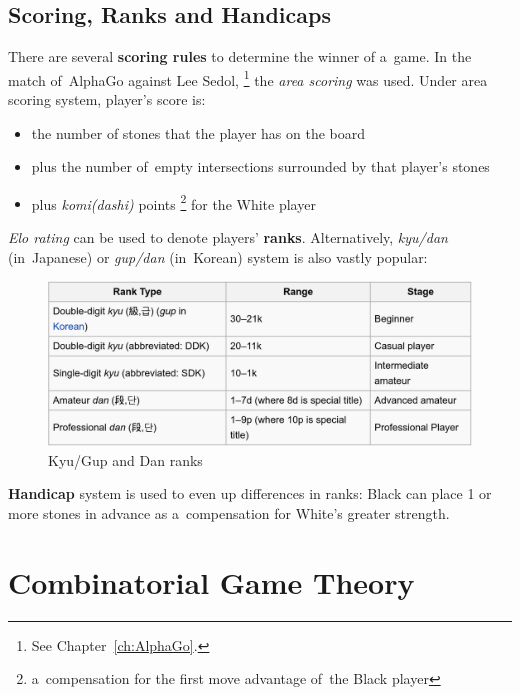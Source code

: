 \subsection{Scoring, Ranks and Handicaps}

There are several \textbf{scoring rules} to determine the winner of a~game.
In the match of~AlphaGo against Lee Sedol,%
\footnote{See Chapter~\ref{ch:AlphaGo}.}
the \emph{area scoring} was used.
Under area scoring system, player's score is:
\begin{itemize}
  \item the number of stones that the player has on the board
  \item plus the number of~empty intersections surrounded by that player's stones
  \item plus \emph{komi(dashi)} points%
    \footnote{a~compensation for the first move advantage of~the Black player}
    for the White player
\end{itemize}

\emph{Elo rating} can be used to denote players' \textbf{ranks}.
Alternatively, \emph{kyu/dan} (in~Japanese) or \emph{gup/dan} (in~Korean) system is also vastly popular:
\begin{figure}[H]
  \centering
  \includegraphics[width=.8\textwidth]{../img/Go_kyu_dan.png}
  \caption{Kyu/Gup and Dan ranks}
  \label{fig:Go-ranks}
\end{figure}

\textbf{Handicap} system is used to even up differences in ranks:
Black can place 1 or more stones in advance as a~compensation for White's greater strength.

\section{Combinatorial Game Theory}
\label{sec:CGT}
\todo

